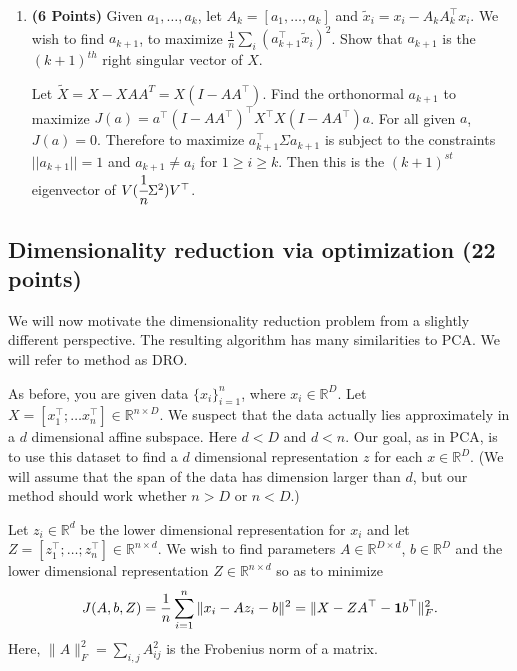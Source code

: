 \documentclass[a4paper]{article}
\newcounter{thm}
\newcommand*{\one}{{\bf 1}}
\theoremstyle{definition}
\newcommand{\RR}{\mathbb{R}}
\newenvironment{soln}{
    \leavevmode\color{blue}\ignorespaces
}{}
\begin{document}
\begin{enumerate}
\begin{soln}
\end{soln}

\item  \textbf{(6 Points)}
Given $a_1, \dots, a_k$, let $A_k = [a_1, \dots, a_k]$ and 
$\tilde{x}_i = x_i - A_kA_k^\top x_i$. We wish to find $a_{k+1}$, to maximize
$\frac{1}{n} \sum_i (a_{k+1}^\top \tilde{x}_i)^2$. Show that $a_{k+1}$ is the
$(k+1)^{th}$ right singular vector of $X$.

\begin{soln}
    Let $\tilde{X} = X - XAA^T = X(I - AA^\top)$. Find the orthonormal $a_{k+1}$ to maximize $J(a) = a^\top (I-AA^\top)^\top X^\top X(I - AA^\top)a$. For all given $a$, $J(a) = 0$. Therefore to maximize $a_{k+1}^\top \Sigma a_{k+1}$ is subject to the constraints $||a_{k+1}|| = 1$ and $a_{k+1} \neq a_i$ for $1 \geq i \geq k$. Then this is the $(k+1)^{st}$ eigenvector of $V (\cfrac{1}{n}\Sigma^2) V^\top$.
    
\end{soln}


\end{enumerate}

\subsection{Dimensionality reduction via optimization (22 points)}

We will now motivate the dimensionality reduction problem from a slightly different
perspective. The resulting algorithm has many similarities to PCA.
We will refer to method as DRO.

As before, you are given data $\{x_i\}_{i=1}^n$, where $x_i \in \RR^D$. Let $X=[x_1^\top; \dots
x_n^\top] \in \RR^{n\times D}$. We suspect that the data
actually lies approximately in  a $d$ dimensional affine subspace.
Here $d<D$ and $d<n$.
Our goal, as in PCA, is to use this dataset to find a $d$ dimensional representation $z$ for each $x\in\RR^D$.
(We will assume that the span of the data has dimension larger than
$d$, but our method should work whether $n>D$ or $n<D$.)


Let $z_i\in \RR^d$ be the lower dimensional representation for $x_i$ and
let $Z = [z_1^\top; \dots; z_n^\top] \in \RR^{n\times d}$.
We wish to find parameters $A \in \RR^{D\times d}$, $b\in\RR^D$ and the lower
dimensional representation $Z\in \RR^{n\times d}$ so as to minimize 
\begin{equation}
J(A,b,Z) = \frac{1}{n} \sum_{i=1}^n \|x_i - Az_i - b\|^2 = \| X - ZA^\top - \one b^\top\|_F^2.
\label{eqn:dimobj}
\end{equation}
Here, $\|A\|^2_F = \sum_{i,j} A_{ij}^2$ is the Frobenius norm of a matrix.
\end{document}
